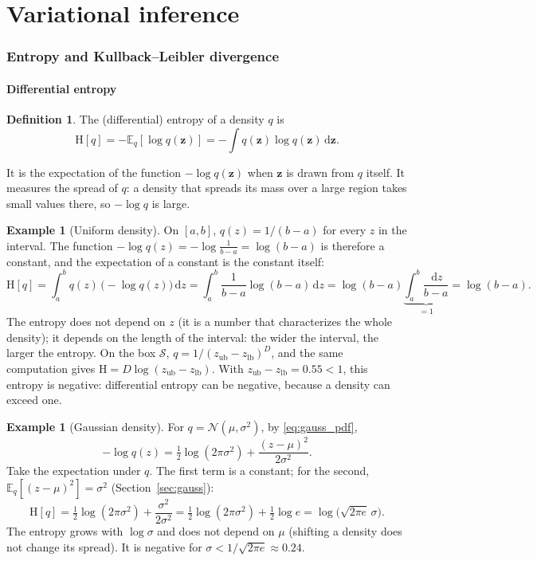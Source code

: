 \documentclass[11pt,a4paper]{article}
\numberwithin{equation}{section}
\theoremstyle{plain}
\theoremstyle{definition}
\newtheorem{definition}[proposition]{Definition}
\newtheorem{example}[proposition]{Example}
\theoremstyle{remark}
\newcommand{\z}{\mathbf{z}}
\newcommand{\Sset}{\mathcal{S}}
\newcommand{\E}{\mathbb{E}}
\newcommand{\Hent}{\mathrm{H}}
\newcommand{\N}{\mathcal{N}}
\newcommand{\dd}{\,\mathrm{d}}
\newcommand{\zlb}{z_{\text{lb}}}
\newcommand{\zub}{z_{\text{ub}}}
\begin{document}
\part{Variational inference}
\label{part:vi}

\section{Entropy and Kullback--Leibler divergence}
\label{sec:kl}

\subsection{Differential entropy}
\begin{definition}
The (differential) entropy of a density $q$ is
\begin{equation}
\Hent[q]=-\E_q[\log q(\z)]=-\int q(\z)\log q(\z)\dd\z.
\end{equation}
\end{definition}
It is the expectation of the function $-\log q(\z)$ when $\z$ is drawn from $q$ itself. It measures the spread of $q$: a density that spreads its mass over a large region takes small values there, so $-\log q$ is large.

\begin{example}[Uniform density]
On $[a,b]$, $q(z)=1/(b-a)$ for every $z$ in the interval. The function $-\log q(z)=-\log\frac1{b-a}=\log(b-a)$ is therefore a constant, and the expectation of a constant is the constant itself:
\begin{equation*}
\Hent[q]=\int_a^b q(z)\,\big(-\log q(z)\big)\dd z=\int_a^b\frac1{b-a}\log(b-a)\dd z=\log(b-a)\underbrace{\int_a^b\frac{\dd z}{b-a}}_{=1}=\log(b-a).
\end{equation*}
The entropy does not depend on $z$ (it is a number that characterizes the whole density); it depends on the length of the interval: the wider the interval, the larger the entropy. On the box $\Sset$, $q=1/(\zub-\zlb)^D$, and the same computation gives $\Hent=D\log(\zub-\zlb)$. With $\zub-\zlb=0.55<1$, this entropy is negative: differential entropy can be negative, because a density can exceed one.
\end{example}

\begin{example}[Gaussian density]
For $q=\N(\mu,\sigma^2)$, by \eqref{eq:gauss_pdf},
\begin{equation*}
-\log q(z)=\tfrac12\log(2\pi\sigma^2)+\frac{(z-\mu)^2}{2\sigma^2}.
\end{equation*}
Take the expectation under $q$. The first term is a constant; for the second, $\E_q[(z-\mu)^2]=\sigma^2$ (Section~\ref{sec:gauss}):
\begin{equation*}
\Hent[q]=\tfrac12\log(2\pi\sigma^2)+\frac{\sigma^2}{2\sigma^2}=\tfrac12\log(2\pi\sigma^2)+\tfrac12\log e=\log\big(\sqrt{2\pi e}\,\sigma\big).
\end{equation*}
The entropy grows with $\log\sigma$ and does not depend on $\mu$ (shifting a density does not change its spread). It is negative for $\sigma<1/\sqrt{2\pi e}\approx0.24$.
\end{example}
\end{document}
